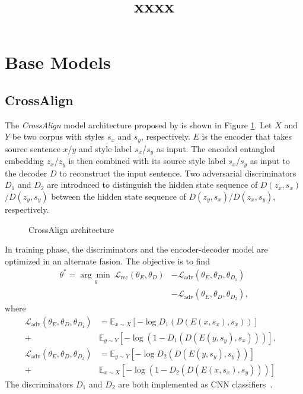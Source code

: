 \documentclass[11pt,a4paper]{article}
\title{xxxx}
\date{}
\newcommand{\figref}[1]{Figure \ref{#1}}
\begin{document}
\appendix
\section{Base Models}
\label{ap:datastats}
\subsection{CrossAlign}
The \emph{CrossAlign} model architecture proposed by \citet{shen2017style} is shown in \figref{fig:crossalign}. Let $X$ and $Y$ be two corpus with styles $s_x$ and $s_y$, respectively. $E$ is the encoder that takes source sentence $x$/$y$ and style label $s_x$/$s_y$ as input. The encoded entangled embedding $z_x$/$z_y$ is then combined with its source style label $s_x$/$s_y$ as input to the decoder $D$ to reconstruct the input sentence. Two adversarial discriminators $D_1$ and $D_2$ are introduced to distinguish the hidden state sequence of $D(z_x, s_x)$/$D(z_y, s_y)$ between the hidden state sequence of $D(z_y, s_x)$/$D(z_x, s_y)$, respectively.

\begin{figure}[htbp]
	\centering
	\caption{CrossAlign architecture}
	\label{fig:crossalign}
\end{figure}

In training phase, the discriminators and the encoder-decoder model are optimized in an alternate fasion. The objective is to find
\begin{align*}
\theta^* = \underset{\theta}{\arg\min\ } \mathcal{L}_{\mathrm{rec}} (\theta_E, \theta_D) &- \mathcal{L} _{\mathrm{adv}}(\theta_E, \theta_{D},\theta_{D_1}) \\
&- \mathcal{L}_{\mathrm{adv}}(\theta_E, \theta_D,\theta_{D_2}),
\end{align*}
where
\begin{align*}
\mathcal{L}_{\mathrm{adv}}(\theta_E, \theta_D,\theta_{D_1}) & = \mathbb{E}_{x\sim X}[-\log D_1(D(E(x, s_x),s_x))] & \\
+ &\mathbb{E}_{y\sim Y}[-\log (1 - D_1(D(E(y, s_y), s_x)))],\\
\mathcal{L}_{\mathrm{adv}}(\theta_E, \theta_D,\theta_{D_2}) & = \mathbb{E}_{y\sim Y}[-\log D_2(D(E(y, s_y),s_y))] & \\
+ &\mathbb{E}_{x\sim X}[-\log (1 - D_2(D(E(x, s_x), s_y)))]
\end{align*}
The discriminators $D_1$ and $D_2$ are both implemented as CNN classifiers~\citep{kim2014convolutional}.
\end{document}
